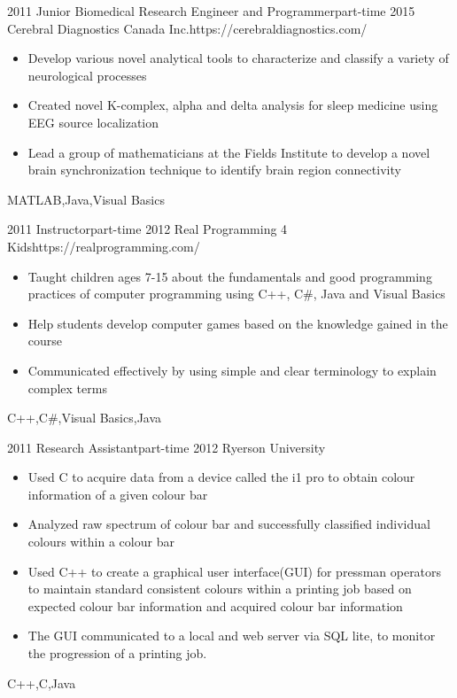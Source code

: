 \begin{experiences}
	\emptySeparator
	
	\myExperience
	{2011}       {Junior Biomedical Research Engineer and Programmer}{part-time}
	{2015}      {Cerebral Diagnostics Canada Inc.}{https://cerebraldiagnostics.com/}
	{
		\begin{itemize}
			\item Develop various novel analytical tools to characterize and classify a variety of neurological processes
			\item Created novel K-complex, alpha and delta analysis for sleep medicine using EEG source localization
			\item Lead a group of mathematicians at the Fields Institute to develop a novel brain synchronization technique to identify brain region connectivity
		\end{itemize}
	}
	{MATLAB,Java,Visual Basics}
	
	\emptySeparator
	
	
	\myExperience
	{2011}       {Instructor}{part-time}
	{2012}      {Real Programming 4 Kids}{https://realprogramming.com/}
	{
		\begin{itemize}
			\item Taught children ages 7-15 about the fundamentals and good programming practices of computer programming using C++, C\#, Java and Visual Basics
			\item Help students develop computer games based on the knowledge gained in the course
			\item Communicated effectively by using simple and clear terminology to explain complex terms
		\end{itemize}
	}
	{C++,C\#,Visual Basics,Java}
	
	\emptySeparator

	\myExperience
	{2011}       {Research Assistant}{part-time}
	{2012}      {Ryerson University}{}
	{
		\begin{itemize}
			\item Used C to acquire data from a device called the i1 pro to obtain colour information of a given colour bar
			\item Analyzed raw spectrum of colour bar and successfully classified individual colours within a colour bar
			\item Used C++ to create a graphical user interface(GUI) for pressman operators to 	maintain standard consistent colours within a printing job based on expected colour bar information and acquired colour bar information
			\item The GUI communicated to a local and web server via SQL lite, to monitor the progression of a printing job.
		\end{itemize}
	}
	{C++,C,Java}
	

\end{experiences}
